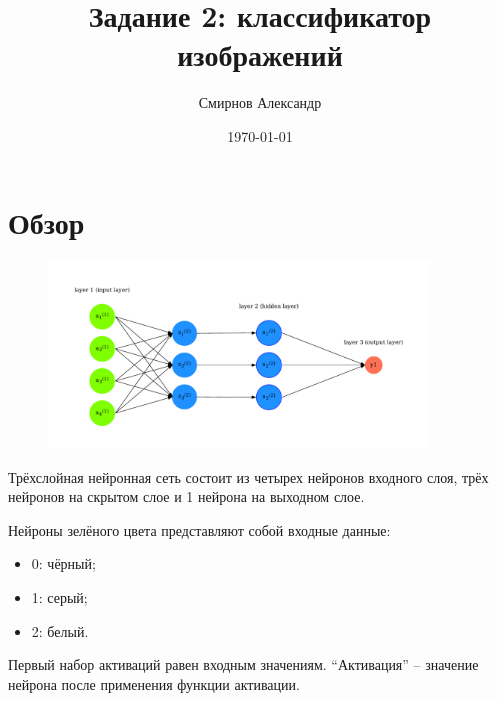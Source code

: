 \documentclass[a4paper,8pt]{article}
\title{Задание 2: классификатор изображений}
\author{
         Смирнов Александр 
}
\date{\today}
\begin{document}
\maketitle

\section*{Обзор}


    \begin{figure}[h]
        \includegraphics[width=0.9\textwidth]{./pic/architecture.pdf}
        \centering
    \end{figure}

Трёхслойная нейронная сеть состоит из четырех нейронов входного слоя, трёх нейронов на скрытом слое и 1 нейрона на выходном слое.

Нейроны зелёного цвета представляют собой входные данные:

\begin{itemize}
    \item 0: чёрный;
    \item 1: серый;
    \item 2: белый.
\end{itemize}

Первый набор активаций равен входным значениям. ``Активация'' -- значение нейрона после применения функции активации.
\end{document}
